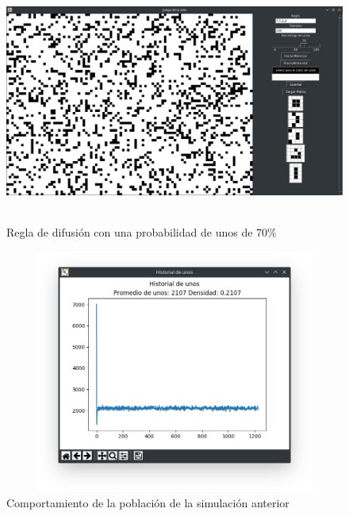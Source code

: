 \begin{figure}[H]
\begin{center}
 \includegraphics[width=12cm, height=8cm]{./img/diffusion70.png}
 \caption{Regla de difusión con una probabilidad de unos de 70\%}
 \label{fig:diffusion70}
\end{center}
\end{figure}

\begin{figure}[H]
\begin{center}
 \includegraphics[width=12cm, height=8cm]{./img/diffusion70grafica.png}
 \caption{Comportamiento de la población de la simulación anterior}
 \label{fig:diffusion70grafica}
\end{center}
\end{figure}

